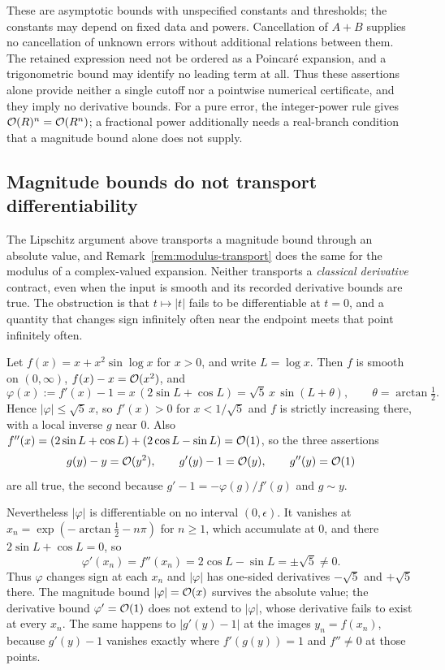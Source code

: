These are asymptotic bounds with unspecified constants and thresholds;
the constants may depend on fixed data and powers. Cancellation of
$A+B$ supplies no cancellation of unknown errors without additional
relations between them. The retained expression need not be ordered as
a Poincar\'e expansion, and a trigonometric bound may identify no leading
term at all. Thus these assertions alone provide neither a single
cutoff nor a pointwise numerical certificate, and they imply no
derivative bounds. For a pure error, the integer-power rule gives
$\mathcal O(R)^n=\mathcal O(R^n)$; a fractional power additionally needs a real-branch
condition that a magnitude bound alone does not supply.

\subsection{Magnitude bounds do not transport differentiability}
\label{sec:magnitude-vs-derivative}

The Lipschitz argument above transports a magnitude bound through an absolute
value, and Remark~\ref{rem:modulus-transport} does the same for the modulus of
a complex-valued expansion. Neither transports a \emph{classical derivative}
contract, even when the input is smooth and its recorded derivative bounds are
true. The obstruction is that $t\mapsto|t|$ fails to be differentiable at
$t=0$, and a quantity that changes sign infinitely often near the endpoint
meets that point infinitely often.

\begin{example}
\label{ex:absolute-value-cusps}
Let $f(x)=x+x^2\sin\log x$ for $x>0$, and write $L=\log x$. Then $f$ is
smooth on $(0,\infty)$, $f(x)-x=\mathcal O(x^2)$, and
\[
 \varphi(x):=f'(x)-1=x\,(2\sin L+\cos L)=\sqrt5\,x\,\sin(L+\theta),
 \qquad \theta=\arctan\tfrac12 .
\]
Hence $|\varphi|\le\sqrt5\,x$, so $f'(x)>0$ for $x<1/\sqrt5$ and $f$ is
strictly increasing there, with a local inverse $g$ near $0$. Also
$f''(x)=(2\sin L+\cos L)+(2\cos L-\sin L)=\mathcal O(1)$, so the three assertions
\[
 g(y)-y=\mathcal O(y^2),\qquad g'(y)-1=\mathcal O(y),\qquad g''(y)=\mathcal O(1)
\]
are all true, the second because $g'-1=-\varphi(g)/f'(g)$ and $g\sim y$.

Nevertheless $|\varphi|$ is differentiable on no interval $(0,\epsilon)$. It
vanishes at $x_n=\exp(-\arctan\tfrac12-n\pi)$ for $n\ge1$, which accumulate at
$0$, and there $2\sin L+\cos L=0$, so
\[
 \varphi'(x_n)=f''(x_n)=2\cos L-\sin L=\pm\sqrt5\ne0 .
\]
Thus $\varphi$ changes sign at each $x_n$ and $|\varphi|$ has one-sided
derivatives $-\sqrt5$ and $+\sqrt5$ there. The magnitude bound
$|\varphi|=\mathcal O(x)$ survives the absolute value; the derivative bound
$\varphi'=\mathcal O(1)$ does not extend to $|\varphi|$, whose derivative fails to
exist at every $x_n$. The same happens to $|g'(y)-1|$ at the images
$y_n=f(x_n)$, because $g'(y)-1$ vanishes exactly where $f'(g(y))=1$ and
$f''\ne0$ at those points.
\end{example}

